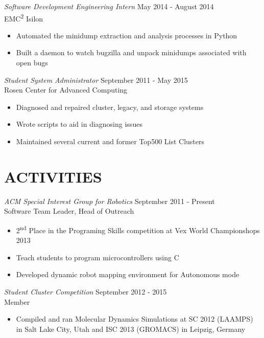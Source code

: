 \documentclass[line,margin]{res}
\begin{document}
\begin{resume}
    {\sl Software Development Engineering Intern} \hfill May 2014 - August 2014 \\
      EMC\textsuperscript{2} Isilon
      \begin{itemize}  \itemsep -2pt
        \item Automated the minidump extraction and analysis processes in Python
        \item Built a daemon to watch bugzilla and unpack minidumps associated with open bugs
      \end{itemize}

    {\sl Student System Administrator} \hfill September 2011 - May 2015 \\
      Rosen Center for Advanced Computing
      \begin{itemize}  \itemsep -2pt %
        \item Diagnosed and repaired cluster, legacy, and storage systems
        \item Wrote scripts to aid in diagnosing issues
        \item Maintained several current and former Top500 List Clusters
      \end{itemize}

  \section{\textcolor{TealBlue}{ACTIVITIES}}
    {\sl ACM Special Interest Group for Robotics} \hfill September 2011 - Present \\
      Software Team Leader, Head of Outreach
      \begin{itemize}  \itemsep -2pt %
        \item 2\textsuperscript{nd} Place in the Programing Skills competition at Vex World Championshops 2013
        \item Teach students to program microcontrollers using C
        \item Developed dynamic robot mapping environment for Autonomous mode
      \end{itemize}
    
    {\sl Student Cluster Competition} \hfill September 2012 - 2015 \\
      Member
      \begin{itemize}  \itemsep -2pt %
        \item Compiled and ran Molecular Dynamics Simulations at SC 2012 (LAAMPS) in Salt Lake City, Utah and ISC 2013 (GROMACS) in Leipzig, Germany
      \end{itemize}
  

\end{resume}
\end{document}

